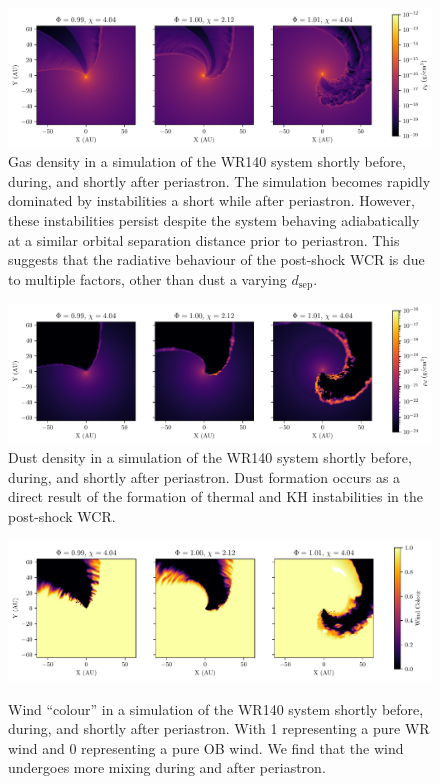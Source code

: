 \documentclass[fleqn,usenatbib]{mnras}
\newcommand{\rms}[1]{\ensuremath{_{\text{#1}}}}
\begin{document}
\begin{figure}
  \centering
  \includegraphics[width=0.95\linewidth]{assets/periastron-3-rho.pdf}
  \caption{Gas density in a simulation of the WR140 system shortly before, during, and shortly after periastron. The simulation becomes rapidly dominated by instabilities a short while after periastron. However, these instabilities persist despite the system behaving adiabatically at a similar orbital separation distance prior to periastron. This suggests that the radiative behaviour of the post-shock WCR is due to multiple factors, other than dust a varying $d\rms{sep}$.}
  \label{fig:p2-fullpage-rho}
\end{figure}

\begin{figure}
  \centering
  \includegraphics[width=0.95\linewidth]{assets/periastron-3-rhod.pdf}
  \caption{Dust density in a simulation of the WR140 system shortly before, during, and shortly after periastron. Dust formation occurs as a direct result of the formation of thermal and KH instabilities in the post-shock WCR.}
  \label{fig:p2-fullpage-rhod}
\end{figure}

\begin{figure}
  \centering
  \includegraphics[width=0.95\linewidth]{assets/periastron-3-r0.pdf}
  \label{fig:p2-fullpage-r0}
  \caption{Wind ``colour'' in a simulation of the WR140 system shortly before, during, and shortly after periastron. With 1 representing a pure WR wind and 0 representing a pure OB wind. We find that the wind undergoes more mixing during and after periastron.}
\end{figure}
\end{document}

